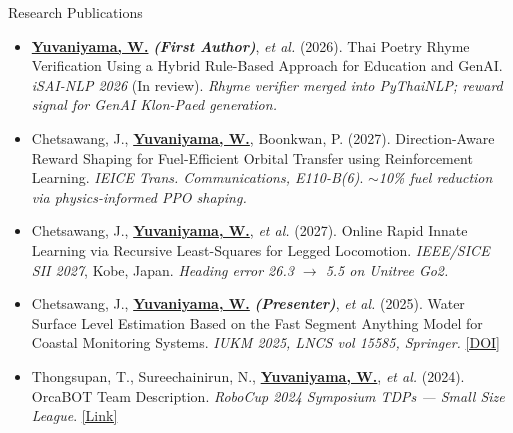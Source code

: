 \documentclass[11pt]{resume} %
\begin{document}
\begin{rSection}{Research Publications}
    \begin{itemize}[leftmargin=*]
        \item \uline{\textbf{Yuvaniyama, W.}} \textbf{\textit{(First Author)}}, \textit{et al.} (2026). Thai Poetry Rhyme Verification Using a Hybrid Rule-Based Approach for Education and GenAI. \textit{iSAI-NLP 2026} (In review). \textit{Rhyme verifier merged into PyThaiNLP; reward signal for GenAI Klon-Paed generation.}
        \item Chetsawang, J., \uline{\textbf{Yuvaniyama, W.}}, Boonkwan, P. (2027). Direction-Aware Reward Shaping for Fuel-Efficient Orbital Transfer using Reinforcement Learning. \textit{IEICE Trans. Communications, E110-B(6)}. \textit{$\sim$10\% fuel reduction via physics-informed PPO shaping.}
        \item Chetsawang, J., \uline{\textbf{Yuvaniyama, W.}}, \textit{et al.} (2027). Online Rapid Innate Learning via Recursive Least-Squares for Legged Locomotion. \textit{IEEE/SICE SII 2027}, Kobe, Japan. \textit{Heading error 26.3\textdegree{} $\to$ 5.5\textdegree{} on Unitree Go2.}
        \item Chetsawang, J., \uline{\textbf{Yuvaniyama, W.}} \textbf{\textit{(Presenter)}}, \textit{et al.} (2025). Water Surface Level Estimation Based on the Fast Segment Anything Model for Coastal Monitoring Systems. \textit{IUKM 2025, LNCS vol 15585, Springer.} \href{https://doi.org/10.1007/978-981-96-4606-7_28}{[DOI]}
        \item Thongsupan, T., Sureechainirun, N., \uline{\textbf{Yuvaniyama, W.}}, \textit{et al.} (2024). OrcaBOT Team Description. \textit{RoboCup 2024 Symposium TDPs --- Small Size League}. \href{https://api.semanticscholar.org/CorpusID:272651803}{[Link]}
    \end{itemize}
\end{rSection}
\end{document}
